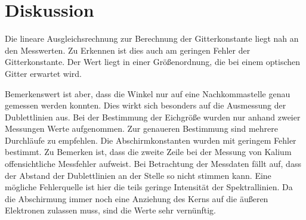 \section{Diskussion}
\label{sec:Diskussion}

Die lineare Ausgleichsrechnung zur Berechnung der Gitterkonstante liegt nah an
den Messwerten.
Zu Erkennen ist dies auch am geringen Fehler der Gitterkonstante. Der Wert liegt
in einer Größenordnung, die bei einem optischen Gitter erwartet wird.

Bemerkenswert ist aber, dass die Winkel nur auf eine Nachkommastelle genau gemessen
werden konnten. Dies wirkt sich besonders auf die Ausmessung der Dublettlinien aus.
Bei der Bestimmung der Eichgröße wurden nur anhand zweier Messungen Werte aufgenommen.
Zur genaueren Bestimmung sind mehrere Durchläufe zu empfehlen.
Die Abschirmkonstanten wurden mit geringem Fehler bestimmt. Zu Bemerken ist, dass
die zweite Zeile bei der Messung von Kalium offensichtliche Messfehler aufweist.
Bei Betrachtung der Messdaten fällt auf, dass der Abstand der Dublettlinien an der Stelle
so nicht stimmen kann. Eine mögliche Fehlerquelle ist hier die teils geringe
Intensität der Spektrallinien.
Da die Abschirmung immer noch eine Anziehung des Kerns auf die äußeren Elektronen
zulassen muss, sind die Werte sehr vernünftig.
